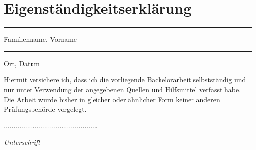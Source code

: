 \chapter*{Eigenständigkeitserklärung}

\thispagestyle{empty}

\vspace{2cm}

\parbox{5cm}{\centering\hrule\medskip Familienname, Vorname}
\vspace{3cm}
\hfill
\parbox{5cm}{\centering\hrule\medskip Ort, Datum}


\vspace{.5cm}

\flushleft

Hiermit versichere ich, dass ich die vorliegende Bachelorarbeit selbstständig und nur unter Verwendung der angegebenen Quellen und Hilfsmittel verfasst habe. Die Arbeit wurde bisher in gleicher oder ähnlicher Form keiner anderen Prüfungsbehörde vorgelegt.
\vspace{20mm}
\begin{flushright}
.................................................

\textit{Unterschrift}

\end{flushright}

												
